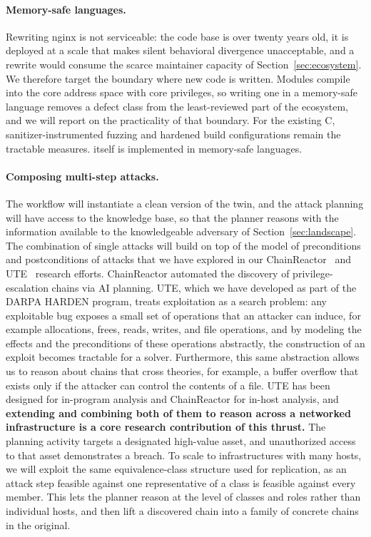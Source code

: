 \paragraph{Memory-safe languages.}
Rewriting nginx is not serviceable: the code base is over twenty years old, it
is deployed at a scale that makes silent behavioral divergence unacceptable,
and a rewrite would consume the scarce maintainer capacity of
Section~\ref{sec:ecosystem}. We therefore target the boundary where new code
is written. Modules compile into the core address space with core privileges,
so writing one in a memory-safe language removes a defect class from the
least-reviewed part of the ecosystem, and we will report on the practicality
of that boundary. For the existing C, sanitizer-instrumented fuzzing and
hardened build configurations remain the tractable measures. \sysname itself
is implemented in memory-safe languages.

\paragraph{Composing multi-step attacks.}
The workflow will instantiate a clean version of the twin, and the attack
planning will have access to the knowledge base, so that the planner reasons
with the information available to the knowledgeable adversary of
Section~\ref{sec:landscape}. The combination of single attacks will build on
top of the model of preconditions and postconditions of attacks that we have
explored in our ChainReactor~\cite{chainreactor} and UTE~\cite{ute} research
efforts. ChainReactor automated the discovery of privilege-escalation chains
via AI planning. UTE, which we have developed as part of the DARPA HARDEN
program, treats exploitation as a search problem: any exploitable bug exposes
a small set of operations that an attacker can induce, for example
allocations, frees, reads, writes, and file operations, and by modeling the effects and the preconditions of these operations
abstractly, the construction of an exploit becomes tractable for a solver. Furthermore, this same
abstraction allows us to reason about chains that cross theories, for
example, a buffer overflow that exists only if the attacker can control the
contents of a file. UTE has been designed for
in-program analysis and ChainReactor for in-host analysis, and
\textbf{extending and combining both of them to reason across a networked
infrastructure is a core research contribution of this thrust.} The planning
activity targets a designated high-value asset, and unauthorized access to
that asset demonstrates a breach. To scale to infrastructures with many
hosts, we will exploit the same equivalence-class structure used for
replication, as an attack step feasible against one representative of a class
is feasible against every member. This lets the planner reason at the level
of classes and roles rather than individual hosts, and then lift a discovered
chain into a family of concrete chains in the original.

